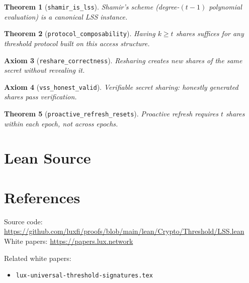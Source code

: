 \documentclass[11pt]{article}
\newtheorem{theorem}{Theorem}
\newtheorem{axiom_stmt}[theorem]{Axiom}
\begin{document}
\begin{theorem}[\texttt{shamir\_is\_lss}]
Shamir's scheme (degree-$(t-1)$ polynomial evaluation) is a canonical LSS instance.
\end{theorem}

\begin{theorem}[\texttt{protocol\_composability}]
Having $k \geq t$ shares suffices for any threshold protocol built on this access structure.
\end{theorem}

\begin{axiom_stmt}[\texttt{reshare\_correctness}]
Resharing creates new shares of the same secret without revealing it.
\end{axiom_stmt}

\begin{axiom_stmt}[\texttt{vss\_honest\_valid}]
Verifiable secret sharing: honestly generated shares pass verification.
\end{axiom_stmt}

\begin{theorem}[\texttt{proactive\_refresh\_resets}]
Proactive refresh requires $t$ shares within each epoch, not across epochs.
\end{theorem}


\section{Lean Source}


\section{References}
\noindent Source code: \url{https://github.com/luxfi/proofs/blob/main/lean/Crypto/Threshold/LSS.lean}\\
\noindent White papers: \url{https://papers.lux.network}

\noindent Related white papers:
\begin{itemize}
  \item \texttt{lux-universal-threshold-signatures.tex}
\end{itemize}
\end{document}
